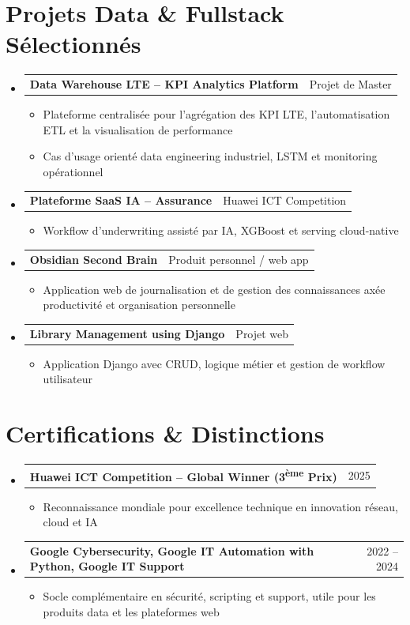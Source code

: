 \documentclass[a4paper,10pt]{article}
\makeatletter
\newcommand{\resumeItem}[1]{\item\small{#1\vspace{-2pt}}}
\newcommand{\resumeProjectHeading}[2]{
  \item
    \begin{tabular*}{0.98\textwidth}{l@{\extracolsep{\fill}}r}
      \small\textbf{#1} & \small #2 \\
    \end{tabular*}\vspace{-6pt}
}
\newcommand{\resumeSubHeadingListStart}{\begin{itemize}[leftmargin=0.15in,label={}]}
\newcommand{\resumeSubHeadingListEnd}{\end{itemize}}
\newcommand{\resumeItemListStart}{\begin{itemize}[leftmargin=*,itemsep=2pt,topsep=2pt]}
\newcommand{\resumeItemListEnd}{\end{itemize}\vspace{-4pt}}
\makeatother
\begin{document}
\section{Projets Data \& Fullstack Sélectionnés}
\resumeSubHeadingListStart
  \resumeProjectHeading
    {\textbf{Data Warehouse LTE -- KPI Analytics Platform}}{Projet de Master}
    \resumeItemListStart
      \resumeItem{Plateforme centralisée pour l'agrégation des KPI LTE, l'automatisation ETL et la visualisation de performance}
      \resumeItem{Cas d'usage orienté data engineering industriel, LSTM et monitoring opérationnel}
    \resumeItemListEnd

  \resumeProjectHeading
    {\textbf{Plateforme SaaS IA -- Assurance}}{Huawei ICT Competition}
    \resumeItemListStart
      \resumeItem{Workflow d'underwriting assisté par IA, XGBoost et serving cloud-native}
    \resumeItemListEnd

  \resumeProjectHeading
    {\textbf{Obsidian Second Brain}}{Produit personnel / web app}
    \resumeItemListStart
      \resumeItem{Application web de journalisation et de gestion des connaissances axée productivité et organisation personnelle}
    \resumeItemListEnd

  \resumeProjectHeading
    {\textbf{Library Management using Django}}{Projet web}
    \resumeItemListStart
      \resumeItem{Application Django avec CRUD, logique métier et gestion de workflow utilisateur}
    \resumeItemListEnd
\resumeSubHeadingListEnd

\section{Certifications \& Distinctions}
\resumeSubHeadingListStart
  \resumeProjectHeading
    {\textbf{Huawei ICT Competition -- Global Winner (3\textsuperscript{ème} Prix)}}{2025}
    \resumeItemListStart
      \resumeItem{Reconnaissance mondiale pour excellence technique en innovation réseau, cloud et IA}
    \resumeItemListEnd

  \resumeProjectHeading
    {\textbf{Google Cybersecurity, Google IT Automation with Python, Google IT Support}}{2022 -- 2024}
    \resumeItemListStart
      \resumeItem{Socle complémentaire en sécurité, scripting et support, utile pour les produits data et les plateformes web}
    \resumeItemListEnd
\resumeSubHeadingListEnd
\end{document}

